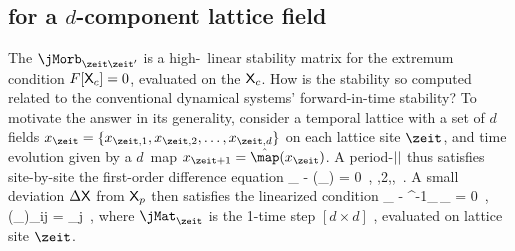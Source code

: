\subsection{{\HillDet} for a $d$-component lattice field}
\label{s:LC21notHill}   %

The {\jacobianOrb} $\jMorb_{\zeit\zeit'}$  is a
high-\dmn\ linear stability matrix for the extremum condition
$F[\mathsf{X}_c]=0$, evaluated on the {\lattstate} $\mathsf{X}_c$. How is the stability
so computed related to the conventional dynamical systems'
for\-ward-in-time stability? To motivate the answer in its generality,
consider a temporal lattice with a set of $d$ fields
$\ssp_{\zeit}=\{\ssp_{\zeit,1},\ssp_{\zeit,2},\dots,\ssp_{\zeit,d}\}$ on
each lattice site $\zeit$, and time evolution given by a $d$\dmn\ map
$\ssp_{\zeit+1}=\hat{\map}(\ssp_{\zeit})$.
A period-${||}$ {\lattstate}  thus
satisfies site-by-site the first-order difference equation
\beq
\ssp_{\zeit} - \hat{\map}(\ssp_{}) = 0
    \,,\qquad
{},2,\cdots,\cl{}
\,.
A small deviation $\Delta\mathsf{X}$ from $\mathsf{X}_p$ then satisfies the linearized condition
\beq
\Delta\ssp_{\zeit} - \shift^{-1}\jMat_{\zeit}\,\Delta\ssp_{\zeit} = 0
\,,\qquad
(\jMat_{\zeit})_{ij}
=
             {\partial \ssp_j                }
\,,
where $\jMat_{\zeit}$ is the 1-time step $[d\!\times\!{d}]$
\jacobianM, evaluated on lattice site $\zeit$.

